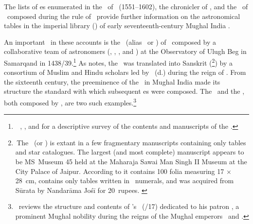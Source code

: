 The lists of \zij es enumerated in the \AiniAkbari\ of \AbulFadlAllami\ (1551--1602), the chronicler of \Akbar, and the \ZijiShahJahani\ of \MullaFarid\ composed during the rule of \Shahjahan\ provide further information on the astronomical tables in the imperial library (\kitabkhana) of early seventeenth-century Mughal India \parencite[Appendices~A and B on pp.--48]{Ghori}. 

An important \zij\ in these accounts is the \ZijSultani\ (alias \ZijUlughBeg\ or \ZijJadidiGurani) of \UlughBegfull\ composed by a collaborative team of astronomers (\alRumi, \alKashi, \UlughBeg, and \aliQushji) at the Observatory of Ulugh Beg in Samarqand in 1438/39.\footnote{\,\Vid\ \textcite[277--279]{RosenfeldandIhsanoglu}, \textcite[54]{KingSamso}, and \textcite[pp.\thinspace 127b--128a and pp.\thinspace 166b--167b]{Kennedysurvey} for a descriptive survey of the contents and manuscripts of the \ZijUlughBeg.} As \textcite[p.\thinspace 581a]{Ansarisurvey} notes, the \ZijUlughBeg\ was translated into Sanskrit (\JicaUlugbegi\thinspace\footnote{\,The \JicaUlugbegi\ (or \Ulakabegijica) is extant in a few fragmentary manuscripts containing only tables and star catalogues. The largest (and most complete) manuscript appears to be MS~Museum 45 held at the Maharaja Sawai Man Singh II Museum at the City Palace of Jaipur. According to \textcite[135]{PingreeJaipur} it contains 100 folia measuring  17 $\times$  28\textonehalf\ cm, contains only tables written in \Nagari\ numerals, and was acquired from S\={u}rata by Nandar\={a}ma Jo\'{s}\={i} for 20\textonehalf\ rupees. \label{jicaulughbeg}}) by a consortium of Muslim and Hindu scholars led by \ShahFathullahShirazi\ (d.) during the reign of \Akbar. From the sixteenth century, the preeminence of the \ZijUlughBeg\ in Mughal India made its structure the standard with which subsequent \zij es were composed. The \ZijiRahimi\ and the \ZijiShahJahani, both composed by \MullaFarid, are two such examples.\footnote{\,\textcite[Section~3.2 on pp.--583]{Ansarisurvey} reviews the structure and contents of \MullaFarid's \ZijiRahimi\ (/17) dedicated to his patron \KhanKhana, a prominent Mughal nobility
during the reigns of the Mughal emperors \Akbar\ and \Jahangir.}

